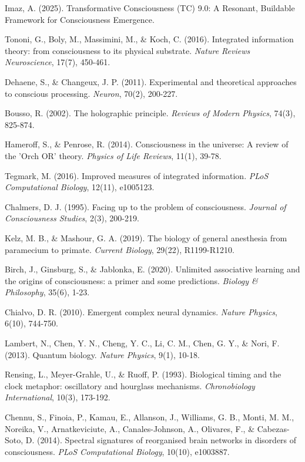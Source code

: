 \documentclass[12pt]{article}
\begin{document}

\begin{thebibliography}{99}
     Imaz, A. (2025). Transformative Consciousness (TC) 9.0: A Resonant, Buildable Framework for Consciousness Emergence.
    
     Tononi, G., Boly, M., Massimini, M., \& Koch, C. (2016). Integrated information theory: from consciousness to its physical substrate. \emph{Nature Reviews Neuroscience}, 17(7), 450-461.
    
     Dehaene, S., \& Changeux, J. P. (2011). Experimental and theoretical approaches to conscious processing. \emph{Neuron}, 70(2), 200-227.
    
     Bousso, R. (2002). The holographic principle. \emph{Reviews of Modern Physics}, 74(3), 825-874.
    
     Hameroff, S., \& Penrose, R. (2014). Consciousness in the universe: A review of the 'Orch OR' theory. \emph{Physics of Life Reviews}, 11(1), 39-78.
    
     Tegmark, M. (2016). Improved measures of integrated information. \emph{PLoS Computational Biology}, 12(11), e1005123.
    
     Chalmers, D. J. (1995). Facing up to the problem of consciousness. \emph{Journal of Consciousness Studies}, 2(3), 200-219.
    
     Kelz, M. B., \& Mashour, G. A. (2019). The biology of general anesthesia from paramecium to primate. \emph{Current Biology}, 29(22), R1199-R1210.
    
     Birch, J., Ginsburg, S., \& Jablonka, E. (2020). Unlimited associative learning and the origins of consciousness: a primer and some predictions. \emph{Biology \& Philosophy}, 35(6), 1-23.
    
     Chialvo, D. R. (2010). Emergent complex neural dynamics. \emph{Nature Physics}, 6(10), 744-750.
    
     Lambert, N., Chen, Y. N., Cheng, Y. C., Li, C. M., Chen, G. Y., \& Nori, F. (2013). Quantum biology. \emph{Nature Physics}, 9(1), 10-18.
    
     Rensing, L., Meyer-Grahle, U., \& Ruoff, P. (1993). Biological timing and the clock metaphor: oscillatory and hourglass mechanisms. \emph{Chronobiology International}, 10(3), 173-192.
    
     Chennu, S., Finoia, P., Kamau, E., Allanson, J., Williams, G. B., Monti, M. M., Noreika, V., Arnatkeviciute, A., Canales-Johnson, A., Olivares, F., \& Cabezas-Soto, D. (2014). Spectral signatures of reorganised brain networks in disorders of consciousness. \emph{PLoS Computational Biology}, 10(10), e1003887.
\end{thebibliography}
\end{document}
